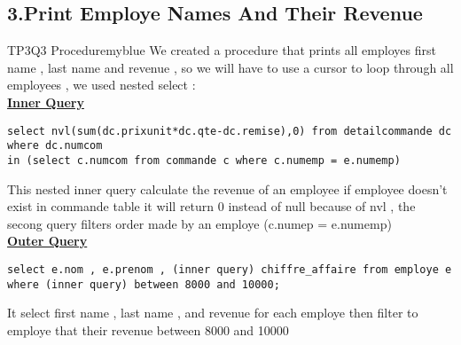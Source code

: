 \vspace{0.03cm}
\subsection*{3.Print Employe Names And Their Revenue}


\begin{prettyBox}{TP3Q3 Procedure}{myblue}
We created a procedure that prints all employes first name , last name and revenue , so we will have to use a cursor
to loop through all employees , we used nested select :\\[0.15cm]
\textbf{\underline{Inner Query}}
\begin{lstlisting}
select nvl(sum(dc.prixunit*dc.qte-dc.remise),0) from detailcommande dc where dc.numcom
in (select c.numcom from commande c where c.numemp = e.numemp)
\end{lstlisting}
This nested inner query calculate the revenue of an employee if employee doesn't exist in commande table it will return 0 instead of null
because of nvl , the secong query filters order made by an employe (c.numep = e.numemp)\\[0.15cm]
\textbf{\underline{Outer Query}}
\begin{lstlisting}
select e.nom , e.prenom , (inner query) chiffre_affaire from employe e
where (inner query) between 8000 and 10000;
\end{lstlisting}
It select first name , last name , and revenue for each employe then filter to employe that their revenue between 8000 and 10000
\end{prettyBox}

\vspace{0.25cm}

